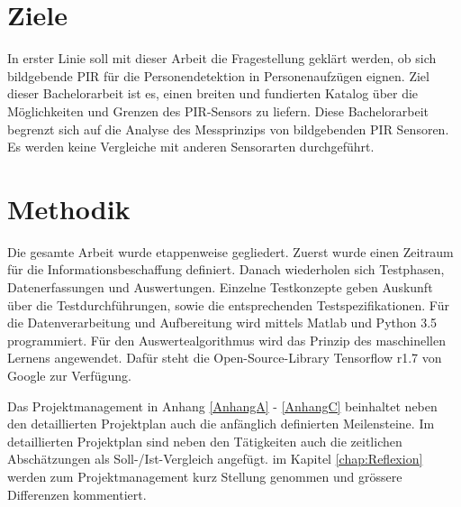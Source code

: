 \section{Ziele}
\label{sec:Einleitung}
In erster Linie soll mit dieser Arbeit die Fragestellung geklärt werden, ob sich bildgebende \ac{PIR} für die Personendetektion in Personenaufzügen eignen. Ziel dieser Bachelorarbeit ist es, einen breiten und fundierten Katalog über die Möglichkeiten und Grenzen des PIR-Sensors zu liefern. Diese Bachelorarbeit begrenzt sich auf die Analyse des Messprinzips von bildgebenden PIR Sensoren. Es werden keine Vergleiche mit anderen Sensorarten durchgeführt.

\section {Methodik}
\label{sec:Methodik}
Die gesamte Arbeit wurde etappenweise gegliedert. Zuerst wurde einen Zeitraum für die Informationsbeschaffung definiert. Danach wiederholen sich Testphasen, Datenerfassungen und Auswertungen. Einzelne Testkonzepte geben Auskunft über die Testdurchführungen, sowie die entsprechenden Testspezifikationen. Für die Datenverarbeitung und Aufbereitung wird mittels Matlab und Python 3.5 programmiert.  Für den Auswertealgorithmus wird das Prinzip des maschinellen Lernens angewendet. Dafür steht die Open-Source-Library Tensorflow r1.7 von Google zur Verfügung.


Das Projektmanagement in Anhang \ref{AnhangA} - \ref{AnhangC}  beinhaltet neben den detaillierten Projektplan auch die anfänglich definierten Meilensteine. Im detaillierten Projektplan sind neben den Tätigkeiten auch die zeitlichen Abschätzungen als Soll-/Ist-Vergleich angefügt. im Kapitel \ref{chap:Reflexion} werden zum Projektmanagement kurz Stellung genommen und grössere Differenzen kommentiert.


